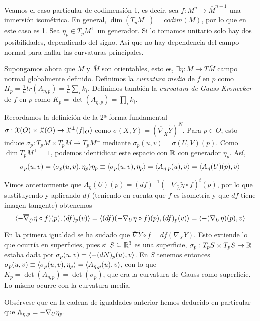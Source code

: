 \documentclass[GSR.tex]{subfiles}
\begin{document}
\begin{ej}
Veamos el caso particular de codimensión 1, es decir, sea $f:M^n\to \overline{M}^{n+1}$ una inmersión isométrica. En general, $\dim(T_pM^\perp)=codim(M)$, por lo que en este caso es 1. Sea $\eta_p\in T_pM^\perp$ un generador. Si lo tomamos unitario solo hay dos posibilidades, dependiendo del signo. Así que no hay dependencia del campo normal para hallar las curvaturas principales. 

Supongamos ahora que $M$ y $\overline{M}$ son orientables, esto es, $\exists\eta:M\to T\overline{M}$ campo normal globalmente definido. Definimos la \emph{curvatura media} de $f$ en $p$ como $H_p=\frac{1}{n}tr(A_{\eta,p})=\frac{1}{n}\sum_i k_i$. Definimos también la \emph{curvatura de Gauss-Kronecker} de $f$ en $p$ como $K_p=\det(A_{\eta,p})=\prod_i k_i$.

Recordamos la definición de la 2ª forma fundamental $\sigma:{\mathfrak{X}}(O)\times{\mathfrak{X}}(O)\to{\mathfrak{X}}^\perp(f|_O)$ como $\sigma(X,Y)=(\overline{\nabla}_{\tilde{X}}\tilde{Y})^N$. Para $p\in O$, esto induce $\sigma_p:T_pM\times T_pM\to T_pM^\perp$ mediante $\sigma_p(u,v)=\sigma(U,V)(p)$. Como $\dim T_pM^\perp=1$, podemos identidicar este espacio con $\mathbb{R}$ con generador $\eta_p$. Así, 
$$\sigma_p(u,v)=\langle{\sigma_p(u,v),\eta_p}\rangle\eta_p\equiv \langle{\sigma_p(u,v),\eta_p}\rangle=\langle{A_{\eta,p}(u),v}\rangle=\langle{A_\eta(U)(p),v}\rangle$$

Vimos anteriormente que $A_\eta(U)(p)=(df)^{-1}(-\overline{\nabla}_{\tilde{U}}\tilde{\eta}\circ f)^t(p)$, por lo que sustituyendo y aplicando $df$ (teniendo en cuenta que $f$ es isometría y que $df$ tiene imagen tangente) obtenemos
$$\langle{-\overline{\nabla}_{\tilde{U}}\tilde{\eta}\circ f)(p), (df)_p(v)}\rangle=\langle{(df)(-\nabla_{U}\eta\circ f)(p), (df)_p(v)}\rangle=\langle{-(\nabla_U\eta)(p),v}\rangle$$

En la primera igualdad se ha sudado que $\overline{\nabla}\tilde{Y}\circ f=df(\nabla_XY)$. Esto extiende lo que ocurría en superficies, pues si $S\subseteq\mathbb{R}^3$ es una superficie, $\sigma_p:T_pS\times T_pS\to \mathbb{R}$ estaba dada por $\sigma_p(u,v)=\langle{-(dN)_p(u),v}\rangle$. En $S$ tenemos entonces $\sigma_p(u,v)\equiv \langle{\sigma_p(u,v),\eta_p}\rangle=\langle{A_{\eta,p}(u),v}\rangle$, con lo que $K_p=\det(A_{\eta,p})=\det(\sigma_p)$, que era la curvatura de Gauss como superficie. Lo mismo ocurre con la curvatura media. 

Obsérvese que en la cadena de igualdades anterior hemos deducido en particular que $\mathbb{A}_{\eta,p}=-\nabla_U\eta_p$. 
\end{ej} 
\end{document}
